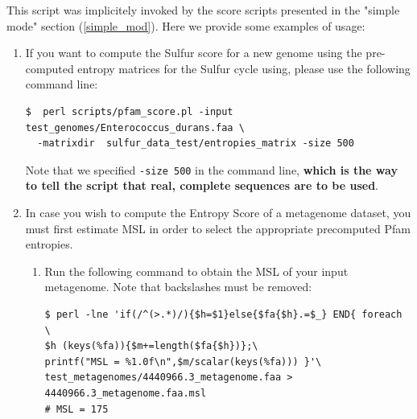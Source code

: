 \documentclass[12pt]{report}
\begin{document}
This script was implicitely invoked by the score scripts presented in the "simple mode" section (\ref{simple_mod}). Here we provide some examples of usage: 
\begin{enumerate}

\item If you want to compute the Sulfur score for a new genome using the pre-computed entropy matrices for the Sulfur cycle using, please use the following command line:
\begin{verbatim}
$  perl scripts/pfam_score.pl -input test_genomes/Enterococcus_durans.faa \
  -matrixdir  sulfur_data_test/entropies_matrix -size 500 
\end{verbatim}
Note that we specified \verb+-size 500+ in the command line, \textbf{which is the way to tell the script that real, complete sequences are to be used}. 


\item In case you wish to compute the Entropy Score of a metagenome dataset, you must first estimate MSL in order to select the appropriate precomputed Pfam entropies. 

\begin{enumerate}
\item Run the following command to obtain the MSL of your input metagenome. Note that backslashes must be removed:  
 
 \begin{verbatim}
$ perl -lne 'if(/^(>.*)/){$h=$1}else{$fa{$h}.=$_} END{ foreach \
$h (keys(%fa)){$m+=length($fa{$h})};\
printf("MSL = %1.0f\n",$m/scalar(keys(%fa))) }'\ 
test_metagenomes/4440966.3_metagenome.faa > 
4440966.3_metagenome.faa.msl 
# MSL = 175
\end{verbatim}


\end{enumerate}
\end{enumerate}
\end{document}
